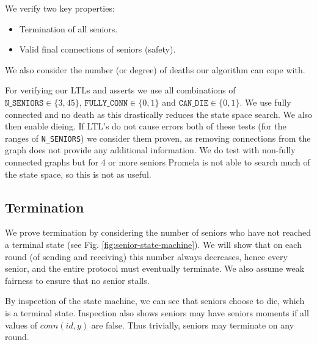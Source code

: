 \documentclass[12pt,a4paper]{scrartcl}
\begin{document}
We verify two key properties:
\begin{itemize}
    \item Termination of all seniors.
    \item Valid final connections of seniors (safety).
\end{itemize}
We also consider the number (or degree) of deaths our algorithm can cope with.

For verifying our LTLs and asserts we use all combinations of $\texttt{N\_SENIORS} \in \{3, 4 5\}$, $\texttt{FULLY\_CONN} \in \{0, 1\}$ and $\texttt{CAN\_DIE} \in \{0, 1\}$.
We use fully connected and no death as this drastically reduces the state space search.
We also then enable dieing.
If LTL's do not cause errors both of these tests (for the ranges of \texttt{N\_SENIORS}) we consider them proven, as removing connections from the graph does not provide any additional information.
We do test with non-fully connected graphs but for 4 or more seniors Promela is not able to search much of the state space, so this is not as useful.

\subsection{Termination}
\label{sub:verify-term}
We prove termination by considering the number of seniors who have not reached a terminal state (see Fig. \ref{fig:senior-state-machine}).
We will show that on each round (of sending and receiving) this number always decreases, hence every senior, and the entire protocol must eventually terminate.
We also assume weak fairness to ensure that no senior stalls.

By inspection of the state machine, we can see that seniors choose to die, which is a terminal state.
Inspection also shows seniors may have seniors moments if all values of $conn(id,y)$ are false.
Thus trivially, seniors may terminate on any round.
\end{document}
